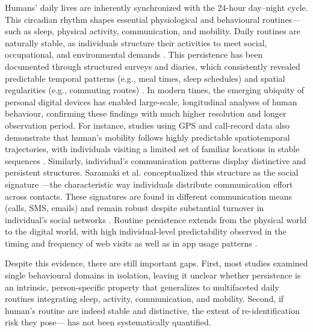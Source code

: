 \documentclass[pdflatex,sn-vancouver,Numbered]{bst/sn-jnl}%
\theoremstyle{thmstyleone}%
\theoremstyle{thmstyletwo}%
\theoremstyle{thmstylethree}%
\begin{document}
Humans’ daily lives are inherently synchronized with the 24-hour day–night cycle. This circadian rhythm shapes essential physiological and behavioural routines—such as sleep, physical activity, communication, and mobility. 
Daily routines are naturally stable, as individuals structure their activities to meet social, occupational, and environmental demands \cite{monk1994regularity}. This persistence has been documented through structured surveys and diaries, which consistently revealed predictable temporal patterns (e.g., meal times, sleep schedules) and spatial regularities (e.g., commuting routes) \cite{hansonSystematicVariabilityRepetitiouTesserae988a, monk1990social, soehnerCircadianPreferenceSleepWake2011}. In modern times, the emerging ubiquity of personal digital devices has enabled large-scale, longitudinal analyses of human behaviour, confirming these findings with much higher resolution and longer observation period. For instance, studies using GPS and call-record data also demonstrate that human's mobility follows highly predictable spatiotemporal trajectories, with individuals visiting a limited set of familiar locations in stable sequences \cite{songLimitsPredictabilityHuman2010, song2010modelling, alessandretti2020scales}. Similarly, individual's communication patterns display distinctive and persistent structures. Saramaki et al. conceptualized this structure as the social signature \cite{saramaki2014persistence}—the characteristic way individuals distribute communication effort across contacts. These signatures are found in different communication means (calls, SMS, emails) and remain robust despite substantial turnover in individual's social networks \cite{saramaki2014persistence, aledavoodDailyRhythmsMobile2015a, heydari2018multichannel, loriteLongTermEvolutionEmail2016}. Routine persistence extends from the physical world to the digital world, with high individual-level predictability observed in the timing and frequency of web visits \cite{barbosa2016returners, hu2018life, kulshrestha2021web} as well as in app usage patterns \cite{malmi2016you, kosinski2013private, petersSocialMediaUse2024, shawBehavioralConsistencyDigital2022}. 

Despite this evidence, there are still important gaps. First, most studies examined single behavioural domains in isolation, leaving it unclear whether persistence is an intrinsic, person-specific property that generalizes to multifaceted daily routines integrating sleep, activity, communication, and mobility. Second, if human's routine are indeed stable and distinctive, the extent of re-identification risk they pose— has not been systematically quantified. 
\end{document}
